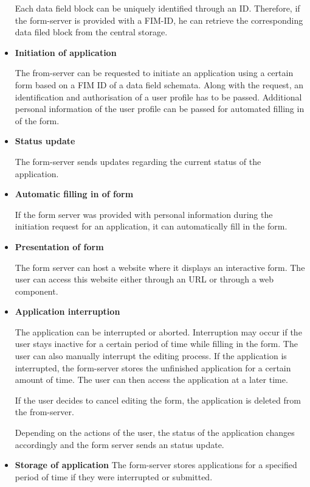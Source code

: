 \begin{itemize}
    Each data field block can be uniquely identified through an ID. Therefore, if the form-server is provided with a FIM-ID, he can retrieve the corresponding data filed block from the central storage.
    
    \item \textbf{Initiation of application}
    
    The from-server can be requested to initiate an application using a certain form based on a FIM ID of a data field schemata. Along with the request, an identification and authorisation of a user profile has to be passed. Additional personal information of the user profile can be passed for automated filling in of the form.
    
    \item \textbf{Status update}
    
    The form-server sends updates regarding the current status of the application.

    \item \textbf{Automatic filling in of form}
    
    If the form server was provided with personal information during the initiation request for an application, it can automatically fill in the form.
    
    \item \textbf{Presentation of form}
    
    The form server can host a website where it displays an interactive form. The user can access this website either through an URL or through a web component.
    
    \item \textbf{Application interruption}
    
    The application can be interrupted or aborted. Interruption may occur if the user stays inactive for a certain period of time while filling in the form. The user can also manually interrupt the editing process. If the application is interrupted, the form-server stores the unfinished application for a certain amount of time. The user can then access the application at a later time.
    
    If the user decides to cancel editing the form, the application is deleted from the from-server.
    
    Depending on the actions of the user, the status of the application changes accordingly and the form server sends an status update.
    
    \item \textbf{Storage of application}
    The form-server stores applications for a specified period of time if they were interrupted or submitted.
    

\end{itemize}
